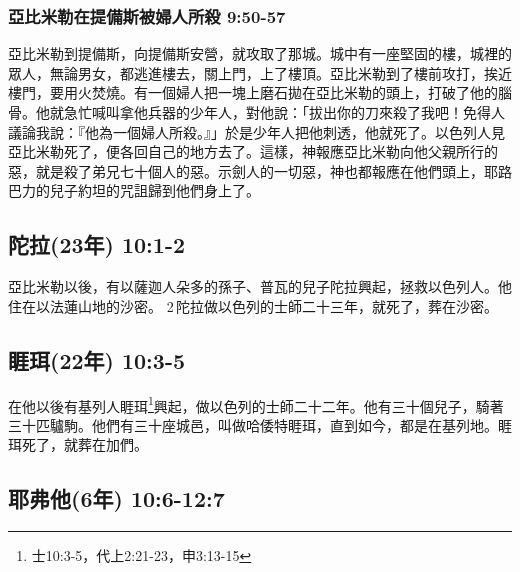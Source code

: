 \subsubsection{亞比米勒在提備斯被婦人所殺 9:50-57}  
亞比米勒到提備斯，向提備斯安營，就攻取了那城。城中有一座堅固的樓，城裡的眾人，無論男女，都逃進樓去，關上門，上了樓頂。亞比米勒到了樓前攻打，挨近樓門，要用火焚燒。有一個婦人把一塊上磨石拋在亞比米勒的頭上，打破了他的腦骨。他就急忙喊叫拿他兵器的少年人，對他說：「拔出你的刀來殺了我吧！免得人議論我說：『他為一個婦人所殺。』」於是少年人把他刺透，他就死了。以色列人見亞比米勒死了，便各回自己的地方去了。這樣，神報應亞比米勒向他父親所行的惡，就是殺了弟兄七十個人的惡。示劍人的一切惡，神也都報應在他們頭上，耶路巴力的兒子約坦的咒詛歸到他們身上了。


\subsection{陀拉(23年) 10:1-2}
亞比米勒以後，有以薩迦人朵多的孫子、普瓦的兒子陀拉興起，拯救以色列人。他住在以法蓮山地的沙密。 2 陀拉做以色列的士師二十三年，就死了，葬在沙密。

\subsection{睚珥(22年) 10:3-5}
在他以後有基列人睚珥\footnote{士10:3-5，代上2:21-23，申3:13-15}興起，做以色列的士師二十二年。他有三十個兒子，騎著三十匹驢駒。他們有三十座城邑，叫做哈倭特睚珥，直到如今，都是在基列地。睚珥死了，就葬在加們。

	 
\subsection{耶弗他(6年)  10:6-12:7}
